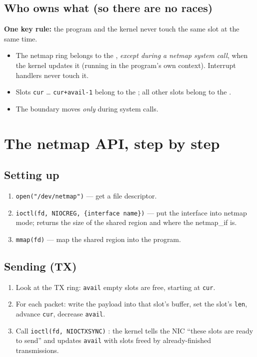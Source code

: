 \subsection{Who owns what (so there are no races)}
\textbf{One key rule:} the program and the kernel never touch the same slot at the same time.
\begin{itemize}
\item The netmap ring belongs to the , \emph{except during a netmap system call}, when the kernel updates it (running in the program's own context). Interrupt handlers never touch it.
\item Slots \texttt{cur} \ldots{} \texttt{cur+avail-1} belong to the ; all other slots belong to the .
\item The boundary moves \emph{only} during system calls.
\end{itemize}

\section{The netmap API, step by step}
\subsection{Setting up}
\begin{enumerate}
\item \texttt{open("/dev/netmap")} --- get a file descriptor.
\item \texttt{ioctl(fd, NIOCREG, \{interface name\})} --- put the interface into netmap mode; returns the size of the shared region and where the netmap\_if is.
\item \texttt{mmap(fd)} --- map the shared region into the program.
\end{enumerate}

\subsection{Sending (TX)}
\begin{enumerate}
\item Look at the TX ring: \texttt{avail} empty slots are free, starting at \texttt{cur}.
\item For each packet: write the payload into that slot's buffer, set the slot's \texttt{len}, advance \texttt{cur}, decrease \texttt{avail}.
\item Call \texttt{ioctl(fd, NIOCTXSYNC)} : the kernel tells the NIC ``these slots are ready to send'' and updates \texttt{avail} with slots freed by already-finished transmissions.
\end{enumerate}

